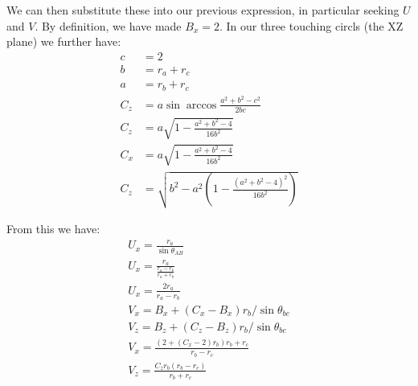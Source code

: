 \documentclass{article}
\begin{document}
We can then substitute these into our previous expression, in particular
seeking $U$ and $V$. By definition, we have made $B_x = 2$.
In our three touching circls (the XZ plane) we further have:
\begin{align}
  c &= 2 \\
  b &= r_a + r_c \\
  a &= r_b + r_c \\
  C_z &= a \sin{\arccos{\frac{a^2 + b^2 - c^2}{2bc}}} \\
  C_z &= a \sqrt{1 - \frac{a^2 + b^2 - 4}{16b^2}} \\
  C_x &= a \sqrt{1 - \frac{a^2 + b^2 - 4}{16b^2}} \\
  C_z &= \sqrt{b^2 - a^2 (1 - \frac{(a^2 + b^2 - 4)^2}{16 b^2})}
\end{align}

From this we have:
\begin{align}
  U_x = \frac{r_a}{\sin{\theta_{AB}}} \\
  U_x = \frac{r_a}{\frac{r_a - r_b}{r_a + r_b}} \\
  U_x = \frac{2 r_a}{r_a - r_b} \\
  V_x = B_x + (C_x - B_x) r_b / \sin{\theta_{bc}} \\
  V_z = B_z + (C_z - B_z) r_b / \sin{\theta_{bc}} \\
  V_x =   \frac{(2 + (C_x - 2) r_b) r_b + r_c}{r_b - r_c} \\
  V_z =  \frac{C_z r_b (r_b - r_c)}{r_b + r_c} \\
\end{align}





\end{document}
